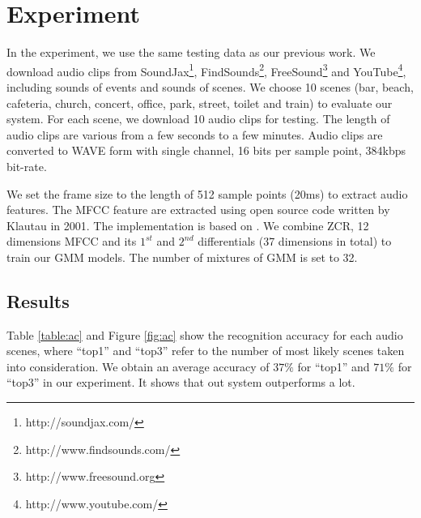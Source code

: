 \chapter{Experiment}
\label{cha:exp}
In the experiment, we use the same testing data as our previous work\cite{LML}. We download audio clips from SoundJax\footnote{http://soundjax.com/}, FindSounds\footnote{http://www.findsounds.com/}, FreeSound\footnote{http://www.freesound.org} and YouTube\footnote{http://www.youtube.com/}, including sounds of events and sounds of scenes. We choose 10 scenes (bar, beach, cafeteria, church, concert, office, park, street, toilet and train) to evaluate our system. For each scene, we download 10 audio clips for testing. The length of audio clips are various from a few seconds to a few minutes. Audio clips are converted to WAVE form with single channel, 16 bits per sample point, 384kbps bit-rate.

We set the frame size to the length of 512 sample points (20ms) to extract audio features. The MFCC feature are extracted using open source code written by Klautau in 2001. The implementation is based on \cite{1163420, 237532,397093,Cardin:1993:ICM:1946943.1947011}. We combine ZCR, 12 dimensions MFCC and its $1^{st}$ and $2^{nd}$ differentials (37 dimensions in total) to train our GMM models. The number of mixtures of GMM is set to 32.


\section{Results}
Table \ref{table:ac} and Figure \ref{fig:ac} show the recognition accuracy for each audio scenes, where ``top1'' and ``top3'' refer to the number of most likely scenes taken into consideration. We obtain an average accuracy of $37\%$ for ``top1'' and $71\%$ for ``top3'' in our experiment. It shows that out system outperforms\cite{LML} a lot.

